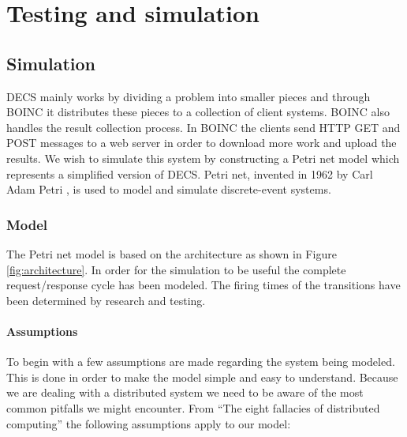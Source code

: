 
\chapter{Testing and simulation}
\label{testing}



\section{Simulation}


DECS mainly works by dividing a problem into smaller pieces and through BOINC \cite{boinc} it distributes these pieces to a collection of client systems.
BOINC also handles the result collection process.
In BOINC the clients send HTTP GET and POST messages to a web server in order to download more work and upload the results.
We wish to simulate this system by constructing a Petri net model which represents a simplified version of DECS.
Petri net, invented in 1962 by Carl Adam Petri \cite{Petri62, Petri66}, is used to model and simulate discrete-event systems.


\subsection{Model}

The Petri net model is based on the architecture as shown in Figure \ref{fig:architecture}.
In order for the simulation to be useful the complete request/response cycle has been modeled.
The firing times of the transitions have been determined by research and testing.


\subsubsection{Assumptions}

To begin with a few assumptions are made regarding the system being modeled.
This is done in order to make the model simple and easy to understand.
Because we are dealing with a distributed system we need to be aware of the most common pitfalls we might encounter.
From ``The eight fallacies of distributed computing'' \cite{distributed-fallacies} the following assumptions apply to our model:

